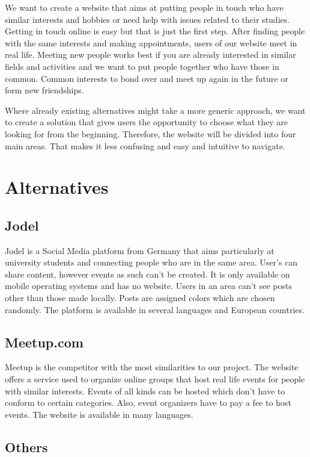 \documentclass[conference]{IEEEtran}
\begin{document}
We want to create a website that aims at putting people in touch who have similar interests and hobbies or need help with issues related to their studies.
Getting in touch online is easy but that is just the first step.
After finding people with the same interests and making appointments, users of our website meet in real life.
Meeting new people works best if you are already interested in similar fields and activities and we want to put people together who have those in common.
Common interests to bond over and meet up again in the future or form new friendships.

Where already existing alternatives might take a more generic approach, we want to create a solution that gives users the opportunity to choose what they are looking for from the beginning.
Therefore, the website will be divided into four main areas.
That makes it less confusing and easy and intuitive to navigate.

\section{Alternatives}


\subsection{Jodel}

Jodel is a Social Media platform from Germany that aims particularly at university students and connecting people who are in the same area.
User’s can share content, however events as such can’t be created.
It is only available on mobile operating systems and has no website.
Users in an area can’t see posts other than those made locally.
Posts are assigned colors which are chosen randomly.
The platform is available in several languages and European countries.

\subsection{Meetup.com}

 Meetup is the competitor with the most similarities to our project.
 The website offers a service used to organize online groups that host real life events for people with similar interests.
 Events of all kinds can be hosted which don’t have to conform to certain categories.
 Also, event organizers have to pay a fee to host events.
 The website is available in many languages.

\subsection{Others}
\end{document}
